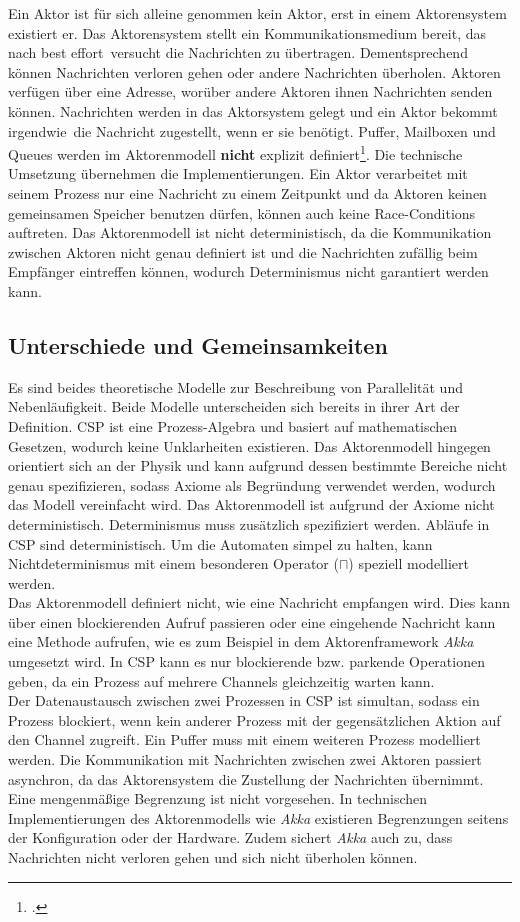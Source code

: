 Ein Aktor ist für sich alleine genommen kein Aktor, erst in einem Aktorensystem existiert er. Das Aktorensystem stellt ein Kommunikationsmedium bereit, das nach \glqq best effort\grqq\ versucht die Nachrichten zu übertragen. Dementsprechend können Nachrichten verloren gehen oder andere Nachrichten überholen. Aktoren verfügen über eine Adresse, worüber andere Aktoren ihnen Nachrichten senden können. Nachrichten werden in das Aktorsystem gelegt und ein Aktor bekommt \glqq irgendwie\grqq\ die Nachricht zugestellt, wenn er sie benötigt. Puffer, Mailboxen und Queues werden im Aktorenmodell \textbf{nicht} explizit definiert\footcite[Seite 3, Rechte Spalte]{ACTORSNEW}. Die technische Umsetzung übernehmen die Implementierungen. Ein Aktor verarbeitet mit seinem Prozess nur eine Nachricht zu einem Zeitpunkt und da Aktoren keinen gemeinsamen Speicher benutzen dürfen, können auch keine Race-Conditions auftreten. Das Aktorenmodell ist nicht deterministisch, da die Kommunikation zwischen Aktoren nicht genau definiert ist und die Nachrichten zufällig beim Empfänger eintreffen können, wodurch Determinismus nicht garantiert werden kann.

\subsection{Unterschiede und Gemeinsamkeiten}
Es sind beides theoretische Modelle zur Beschreibung von Parallelität und Nebenläufigkeit. 
Beide Modelle unterscheiden sich bereits in ihrer Art der Definition. \ac{CSP} ist eine Prozess-Algebra und basiert auf mathematischen Gesetzen, wodurch keine Unklarheiten existieren. Das Aktorenmodell hingegen orientiert sich an der Physik und kann aufgrund dessen bestimmte Bereiche nicht genau spezifizieren, sodass Axiome als Begründung verwendet werden, wodurch das Modell vereinfacht wird. Das Aktorenmodell ist aufgrund der Axiome nicht deterministisch. Determinismus muss zusätzlich spezifiziert werden. Abläufe in \ac{CSP} sind deterministisch. Um die Automaten simpel zu halten, kann Nichtdeterminismus mit einem besonderen Operator ($\sqcap$) speziell modelliert werden.\\
Das Aktorenmodell definiert nicht, wie eine Nachricht empfangen wird. Dies kann über einen blockierenden Aufruf passieren oder eine eingehende Nachricht kann eine Methode aufrufen, wie es zum Beispiel in dem Aktorenframework \textit{Akka} umgesetzt wird. In \ac{CSP} kann es nur blockierende bzw. parkende Operationen geben, da ein Prozess auf mehrere Channels gleichzeitig warten kann.\\
Der Datenaustausch zwischen zwei Prozessen in \ac{CSP} ist simultan, sodass ein Prozess blockiert, wenn kein anderer Prozess mit der gegensätzlichen Aktion auf den Channel zugreift. Ein Puffer muss mit einem weiteren Prozess modelliert werden. Die Kommunikation mit Nachrichten zwischen zwei Aktoren passiert asynchron, da das Aktorensystem die Zustellung der Nachrichten übernimmt. Eine mengenmäßige Begrenzung ist nicht vorgesehen. In technischen Implementierungen des Aktorenmodells wie \textit{Akka} existieren Begrenzungen seitens der Konfiguration oder der Hardware. Zudem sichert \textit{Akka} auch zu, dass Nachrichten nicht verloren gehen und sich nicht überholen können.
